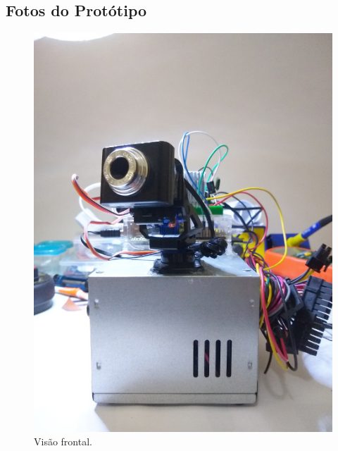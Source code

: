 
\begin{apendicesenv}
\partapendices





\chapter{Fotos do Protótipo} %
\label{chap:fotosprototipo}

\begin{figure}[H]
	\centering
	\includegraphics[width=1\linewidth]{figuras/vista_frontal}
	\caption{Visão frontal.}
	\label{fig:vistafrontal}
\end{figure}


\end{apendicesenv}
